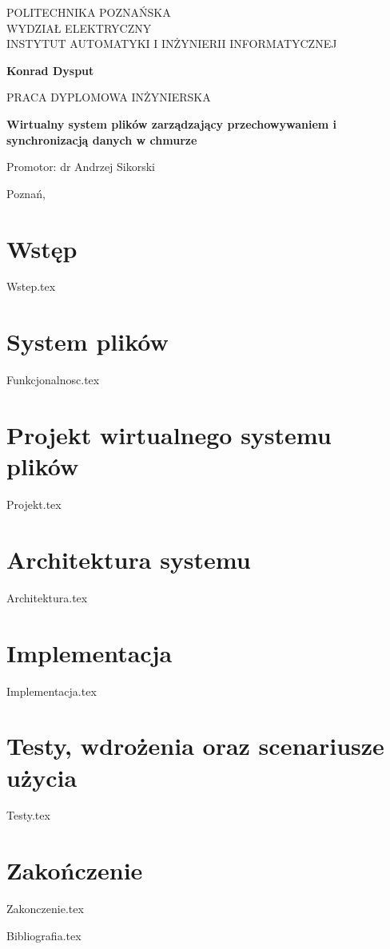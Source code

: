 \documentclass[12pt,a4paper,leqno,oneside,titlepage]{mwrep}
\begin{document}
\begin{titlepage}
\begin{center}
{\large POLITECHNIKA POZNAŃSKA\\ WYDZIAŁ ELEKTRYCZNY\\ INSTYTUT AUTOMATYKI I INŻYNIERII INFORMATYCZNEJ\par}
\end{center}
\vspace{1.5cm plus 1fill}
\begin{center}
{\bf \Large Konrad Dysput\par}
\end{center}
\vspace{1.5cm plus 1mm minus 2mm}
\begin{center}
{\large PRACA DYPLOMOWA INŻYNIERSKA\par}
\end{center}
\vspace{1.5cm plus 1mm minus 2mm}
\begin{center}
{\huge\textbf{Wirtualny system plików zarządzający przechowywaniem i synchronizacją danych w chmurze}\par}
\vspace{1.5cm plus 1.5fill}
\begin{flushright}
{\large Promotor: dr Andrzej Sikorski}
\end{flushright}
\vspace{4cm plus .1fill}
{\large Poznań,\par}
\end{center}
\end{titlepage}

\tableofcontents

\chapter{Wstęp}
{Wstep.tex}

\chapter{System plików}
{Funkcjonalnosc.tex}

\chapter{Projekt wirtualnego systemu plików}
{Projekt.tex}


\chapter{Architektura systemu}
{Architektura.tex}

\chapter{Implementacja}
{Implementacja.tex}

\chapter{Testy, wdrożenia oraz scenariusze użycia}
{Testy.tex}

\chapter{Zakończenie}
{Zakonczenie.tex}


{Bibliografia.tex}
\end{document}
